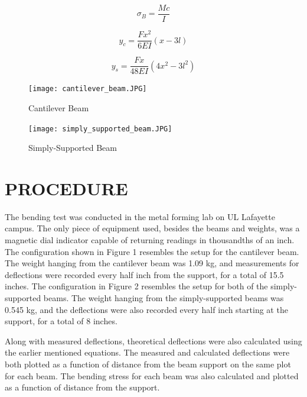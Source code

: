 \documentclass[12pt]{article}
\begin{document}
\begin{equation}
\sigma_{B} = \frac {Mc}{I}
\end{equation}

\bigskip
\begin{equation}
y_{c} = \frac{Fx^2}{6EI}(x-3l)
\end{equation}

\bigskip
\begin{equation}
y_{s} = \frac{Fx}{48EI}(4x^2-3l^2)
\end{equation}
\bigskip


\begin{figure}[h!]  
  \centering
    \texttt{[image: cantilever\_beam.JPG]}
    \caption{Cantilever Beam}
\end{figure}

\newpage

\begin{figure}[h!]  
  \centering
    \texttt{[image: simply\_supported\_beam.JPG]}
    \caption{Simply-Supported Beam}
\end{figure}

\bigskip


\section*{\fontsize{12}{12}\selectfont PROCEDURE}
The bending test was conducted in the metal forming lab on UL Lafayette campus. The only piece of equipment used, besides the beams and weights, was a magnetic dial indicator capable of returning readings in thousandths of an inch. The configuration shown in Figure 1 resembles the setup for the cantilever beam. The weight hanging from the cantilever beam was 1.09 kg, and measurements for deflections were recorded every half inch from the support, for a total of 15.5 inches. The configuration in Figure 2 resembles the setup for both of the simply-supported beams. The weight hanging from the simply-supported beams was 0.545 kg, and the deflections were also recorded every half inch starting at the support, for a total of 8 inches.
\bigskip

Along with measured deflections, theoretical deflections were also calculated using the earlier mentioned equations. The measured and calculated deflections were both plotted as a function of distance from the beam support on the same plot for each beam. The bending stress for each beam was also calculated and plotted as a function of distance from the support. 
\bigskip
\end{document}
